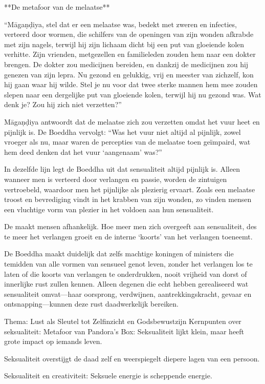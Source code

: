 **De metafoor van de melaatse**

“Māgaṇḍiya, stel dat er een melaatse was, bedekt met zweren en infecties, verteerd door wormen, die schilfers van de openingen van zijn wonden afkrabde met zijn nagels, terwijl hij zijn lichaam dicht bij een put van gloeiende kolen verhitte. Zijn vrienden, metgezellen en familieleden zouden hem naar een dokter brengen. De dokter zou medicijnen bereiden, en dankzij de medicijnen zou hij genezen van zijn lepra. Nu gezond en gelukkig, vrij en meester van zichzelf, kon hij gaan waar hij wilde. Stel je nu voor dat twee sterke mannen hem mee zouden slepen naar een dergelijke put van gloeiende kolen, terwijl hij nu gezond was. Wat denk je? Zou hij zich niet verzetten?”

Māgaṇḍiya antwoordt dat de melaatse zich zou verzetten omdat het vuur heet en pijnlijk is. De Boeddha vervolgt: “Was het vuur niet altijd al pijnlijk, zowel vroeger als nu, maar waren de percepties van de melaatse toen geïmpaird, wat hem deed denken dat het vuur ‘aangenaam’ was?”

In dezelfde lijn legt de Boeddha uit dat sensualiteit altijd pijnlijk is. Alleen wanneer men is verteerd door verlangen en passie, worden de zintuigen vertroebeld, waardoor men het pijnlijke als plezierig ervaart. Zoals een melaatse troost en bevrediging vindt in het krabben van zijn wonden, zo vinden mensen een vluchtige vorm van plezier in het voldoen aan hun sensualiteit.

De maakt mensen afhankelijk. Hoe meer men zich overgeeft aan sensualiteit, des te meer het verlangen groeit en de interne ‘koorts’ van het verlangen toeneemt.

De Boeddha maakt duidelijk dat zelfs machtige koningen of ministers die temidden van alle vormen van sensueel genot leven, zonder het verlangen los te laten of die koorts van verlangen te onderdrukken, nooit vrijheid van dorst of innerlijke rust zullen kennen. Alleen degenen die echt hebben gerealiseerd wat sensualiteit omvat—haar oorsprong, verdwijnen, aantrekkingskracht, gevaar en ontsnapping—kunnen deze rust daadwerkelijk bereiken.

Thema: Lust als Sleutel tot Zelfinzicht en Godsbewustzijn
Kernpunten over seksualiteit:
Metafoor van Pandora's Box: Seksualiteit lijkt klein, maar heeft grote impact op iemands leven.

Seksualiteit overstijgt de daad zelf en weerspiegelt diepere lagen van een persoon.

Seksualiteit en creativiteit:
Seksuele energie is scheppende energie.

